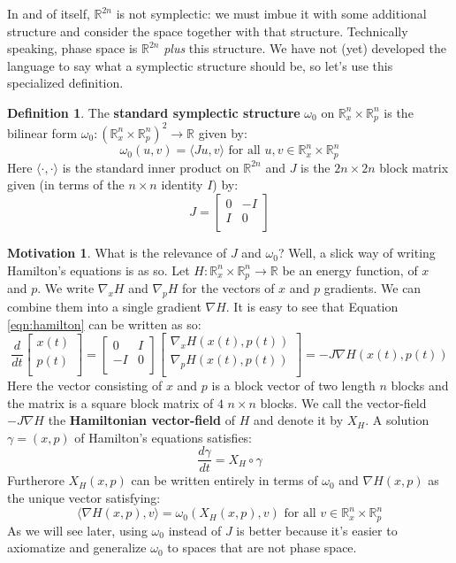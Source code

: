 \documentclass[12pt]{article}
\theoremstyle{definition}
\newtheorem{definition}[theorem]{Definition}
\newtheorem{motivation}[theorem]{Motivation}
\numberwithin{equation}{section}
\newcommand{\R}{{\mathbb R}}
\begin{document}
In and of itself, $\R^{2n}$ is not symplectic: we must imbue it with some additional structure and consider the space together with that structure. Technically speaking, phase space is $\R^{2n}$ \emph{plus} this structure. We have not (yet) developed the language to say what a symplectic structure should be, so let's use this specialized definition.

\begin{definition} The {\bf standard symplectic structure} $\omega_0$ on $\R^n_x \times \R^n_p$ is the bilinear form $\omega_0:(\R^n_x \times \R^n_p)^2 \to \R$ given by:
\[
\omega_0(u,v) = \langle Ju,v\rangle \text{ for all }u,v \in \R^n_x \times \R^n_p
\]
Here $\langle \cdot,\cdot\rangle$ is the standard inner product on $\R^{2n}$ and $J$ is the $2n \times 2n$ block matrix given (in terms of the $n \times n$ identity $I$) by:
\[
J = \left[\begin{array}{cc}
0 & -I\\
I & 0\\
\end{array}\right] 
\]
\end{definition}

\begin{motivation} What is the relevance of $J$ and $\omega_0$? Well, a slick way of writing Hamilton's equations is as so. Let $H:\R^n_x \times \R^n_p \to \R$ be an energy function, of $x$ and $p$. We write $\nabla_x H$ and $\nabla_p H$ for the vectors of $x$ and $p$ gradients. We can combine them into a single gradient $\nabla H$. It is easy to see that Equation \ref{eqn:hamilton} can be written as so:
\[
\frac{d}{dt}\left[\begin{array}{c}
x(t)\\
p(t)\\
\end{array}\right] = \left[\begin{array}{cc}
0 & I\\
-I & 0\\
\end{array}\right] 
\left[\begin{array}{c}
\nabla_x H(x(t),p(t))\\
\nabla_p H(x(t),p(t))\\
\end{array}\right] = -J\nabla H(x(t),p(t))
\]
Here the vector consisting of $x$ and $p$ is a block vector of two length $n$ blocks and the matrix is a square block matrix of $4$ $n \times n$ blocks. We call the vector-field $-J\nabla H$ the {\bf Hamiltonian vector-field} of $H$ and denote it by $X_H$. A solution $\gamma = (x,p)$ of Hamilton's equations satisfies:
\[
\frac{d\gamma}{dt} = X_H \circ \gamma
\]
Furtherore $X_H(x,p)$ can be written entirely in terms of $\omega_0$ and $\nabla H(x,p)$ as the unique vector satisfying:
\[
\langle \nabla H(x,p),v\rangle = \omega_0(X_H(x,p),v) \text{ for all }v \in \R^n_x \times \R^n_p
\]
As we will see later, using $\omega_0$ instead of $J$ is better because it's easier to axiomatize and generalize $\omega_0$ to spaces that are not phase space.\end{motivation}
\end{document}
